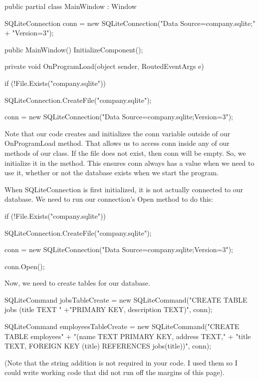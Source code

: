 \documentclass[oneside, openany] {book}
\begin{document}
\begin{CSharp}
public partial class MainWindow : Window
    {
        SQLiteConnection conn = new SQLiteConnection("Data Source=company.sqlite;"
        + "Version=3");
        
        public MainWindow()
        {
            InitializeComponent();
        }

        private void OnProgramLoad(object sender, RoutedEventArgs e)
        {
            if (!File.Exists("company.sqlite"))
            {
                SQLiteConnection.CreateFile("company.sqlite");
               
                conn = new SQLiteConnection("Data Source=company.sqlite;Version=3");
            }
        }
    }
\end{CSharp}

Note that our code creates and initializes the conn variable outside of our OnProgramLoad method. That allows us to access conn inside any of our methods of our class. If the file does not exist, then conn will be empty. So, we initialize it in the method. This ensures conn always has a value when we need to use it, whether or not the database exists when we start the program.

When SQLiteConnection is first initialized, it is not actually connected to our database. We need to run our connection's Open method to do this:

\begin{CSharp}
if (!File.Exists("company.sqlite"))
            {
                SQLiteConnection.CreateFile("company.sqlite");
               
                conn = new SQLiteConnection("Data Source=company.sqlite;Version=3");

                conn.Open();
            }
\end{CSharp}
Now, we need to create tables for our database.

\begin{CSharp}
SQLiteCommand jobsTableCreate = new SQLiteCommand("CREATE TABLE jobs (title TEXT " 
+"PRIMARY KEY, description TEXT)", conn);

SQLiteCommand employeesTableCreate = new SQLiteCommand("CREATE TABLE employees" +
"(name TEXT PRIMARY KEY, address TEXT,"
                    + "title TEXT, FOREIGN KEY (title) REFERENCES jobs(title))", conn);

\end{CSharp}

(Note that the string addition is not required in your code. I used them so I could write working code that did not run off the margins of this page).
\end{document}

